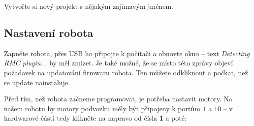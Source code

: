 \documentclass[main.tex]{subfiles}
\begin{document}
	\begin{question}
		Vytvořte si nový projekt s nějakým zajímavým jménem.
	\end{question}

	\subsection{Nastavení robota}
	Zapněte robota, přes USB ho připojte k počítači a obnovte okno -- text \textit{Detecting RMC plugin...} by měl zmizet. Je také možné, že se místo této zprávy objeví požadavek na updatování firmwaru robota. Ten můžete odkliknout a počkat, než se update nainstaluje.

	Před tím, než robota začneme programovat, je potřeba nastavit motory. Na našem robotu by motory podvozku měly být připojeny k portům $1$ a $10$ -- v hardwarové části tedy klikněte na  napravo od čísla \textbf{1} a poté:
\end{document}
